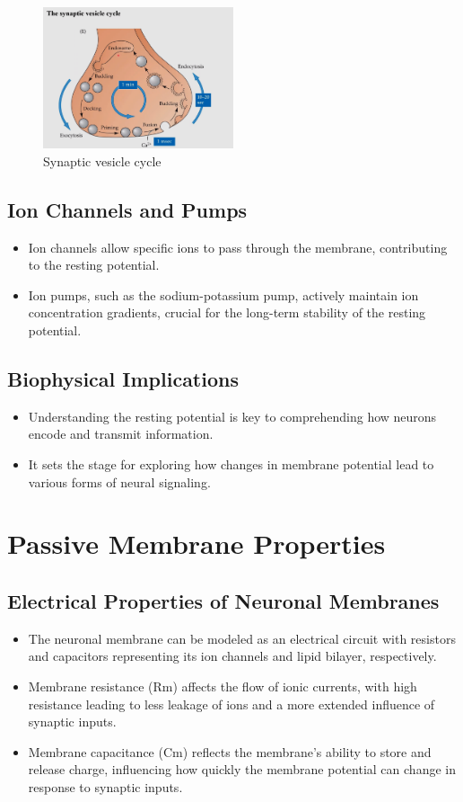 \documentclass{article}
\begin{document}
\begin{figure}[H]
\centering
\includegraphics[width=0.5\textwidth]{assets/synaptic-vesicle-cycle.png}
\caption{Synaptic vesicle cycle}
\end{figure}

\subsection{Ion Channels and Pumps}
\begin{itemize}
    \item Ion channels allow specific ions to pass through the membrane, contributing to the resting potential.
    \item Ion pumps, such as the sodium-potassium pump, actively maintain ion concentration gradients, crucial for the long-term stability of the resting potential.
\end{itemize}

\subsection{Biophysical Implications}
\begin{itemize}
    \item Understanding the resting potential is key to comprehending how neurons encode and transmit information.
    \item It sets the stage for exploring how changes in membrane potential lead to various forms of neural signaling.
\end{itemize}
\section{Passive Membrane Properties}

\subsection{Electrical Properties of Neuronal Membranes}
\begin{itemize}
    \item The neuronal membrane can be modeled as an electrical circuit with resistors and capacitors representing its ion channels and lipid bilayer, respectively.
    \item Membrane resistance (Rm) affects the flow of ionic currents, with high resistance leading to less leakage of ions and a more extended influence of synaptic inputs.
    \item Membrane capacitance (Cm) reflects the membrane's ability to store and release charge, influencing how quickly the membrane potential can change in response to synaptic inputs.
\end{itemize}
\end{document}
